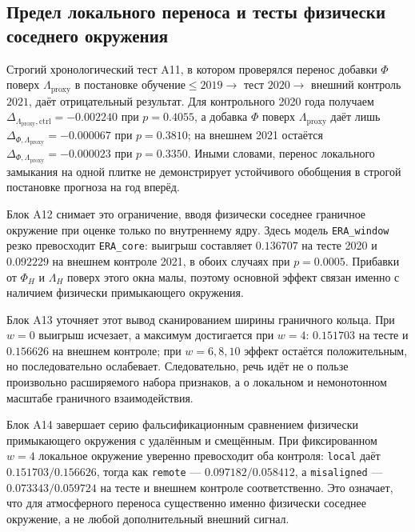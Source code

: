 \documentclass[11pt,a4paper]{article}
\theoremstyle{definition}
\theoremstyle{plain}
\theoremstyle{remark}
\begin{document}
\subsection{Предел локального переноса и тесты физически соседнего окружения}

Строгий хронологический тест A11, в котором проверялся перенос добавки $\Phi$ поверх $\Lambda_{\mathrm{proxy}}$ в постановке обучение$\le 2019 \rightarrow$ тест $2020 \rightarrow$ внешний контроль $2021$, даёт отрицательный результат. Для контрольного 2020 года получаем $\Delta_{\Lambda_{\mathrm{proxy}},\mathrm{ctrl}}=-0.002240$ при $p=0.4055$, а добавка $\Phi$ поверх $\Lambda_{\mathrm{proxy}}$ даёт лишь $\Delta_{\Phi,\Lambda_{\mathrm{proxy}}}=-0.000067$ при $p=0.3810$; на внешнем 2021 остаётся $\Delta_{\Phi,\Lambda_{\mathrm{proxy}}}=-0.000023$ при $p=0.3350$. Иными словами, перенос локального замыкания на одной плитке не демонстрирует устойчивого обобщения в строгой постановке прогноза на год вперёд.

Блок A12 снимает это ограничение, вводя физически соседнее граничное окружение при оценке только по внутреннему ядру. Здесь модель \texttt{ERA\_window} резко превосходит \texttt{ERA\_core}: выигрыш составляет $0.136707$ на тесте 2020 и $0.092229$ на внешнем контроле 2021, в обоих случаях при $p=0.0005$. Прибавки от $\Phi_H$ и $\Lambda_H$ поверх этого окна малы, поэтому основной эффект связан именно с наличием физически примыкающего окружения.

Блок A13 уточняет этот вывод сканированием ширины граничного кольца. При $w=0$ выигрыш исчезает, а максимум достигается при $w=4$: $0.151703$ на тесте и $0.156626$ на внешнем контроле; при $w=6,8,10$ эффект остаётся положительным, но последовательно ослабевает. Следовательно, речь идёт не о пользе произвольно расширяемого набора признаков, а о локальном и немонотонном масштабе граничного взаимодействия.

Блок A14 завершает серию фальсификационным сравнением физически примыкающего окружения с удалённым и смещённым. При фиксированном $w=4$ локальное окружение уверенно превосходит оба контроля: \texttt{local} даёт $0.151703/0.156626$, тогда как \texttt{remote} --- $0.097182/0.058412$, а \texttt{misaligned} --- $0.073343/0.059724$ на тесте и внешнем контроле соответственно. Это означает, что для атмосферного переноса существенно именно физически соседнее окружение, а не любой дополнительный внешний сигнал.
\end{document}
